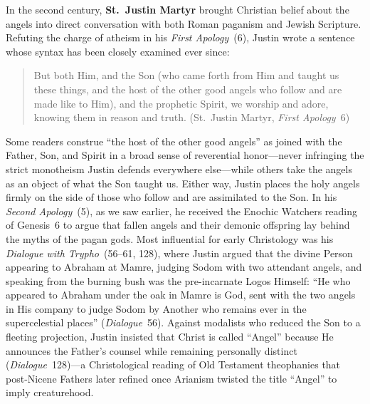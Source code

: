 In the second century, \textbf{St.~Justin Martyr} brought Christian belief about the angels into direct conversation with both Roman paganism and Jewish Scripture. Refuting the charge of atheism in his \emph{First Apology}~(6), Justin wrote a sentence whose syntax has been closely examined ever since:
\begin{quotation}
But both Him, and the Son (who came forth from Him and taught us these things, and the host of the other good angels who follow and are made like to Him), and the prophetic Spirit, we worship and adore, knowing them in reason and truth. (St.~Justin Martyr, \emph{First Apology}~6)
\end{quotation}
Some readers construe ``the host of the other good angels'' as joined with the Father, Son, and Spirit in a broad sense of reverential honor---never infringing the strict monotheism Justin defends everywhere else---while others take the angels as an object of what the Son taught us. Either way, Justin places the holy angels firmly on the side of those who follow and are assimilated to the Son. In his \emph{Second Apology}~(5), as we saw earlier, he received the Enochic Watchers reading of Genesis~6 to argue that fallen angels and their demonic offspring lay behind the myths of the pagan gods. Most influential for early Christology was his \emph{Dialogue with Trypho}~(56--61, 128), where Justin argued that the divine Person appearing to Abraham at Mamre, judging Sodom with two attendant angels, and speaking from the burning bush was the pre-incarnate Logos Himself: ``He who appeared to Abraham under the oak in Mamre is God, sent with the two angels in His company to judge Sodom by Another who remains ever in the supercelestial places'' (\emph{Dialogue}~56). Against modalists who reduced the Son to a fleeting projection, Justin insisted that Christ is called ``Angel'' because He announces the Father's counsel while remaining personally distinct (\emph{Dialogue}~128)---a Christological reading of Old Testament theophanies that post-Nicene Fathers later refined once Arianism twisted the title ``Angel'' to imply creaturehood.

